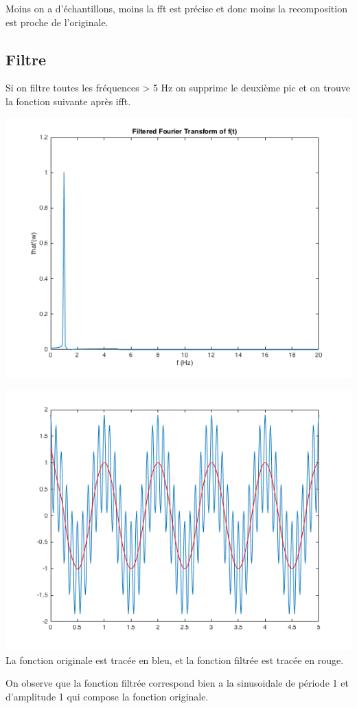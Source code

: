 \documentclass[a4paper,11pt]{article}
\begin{document}
Moins on a d'échantillons, moins la fft est précise et donc moins la recomposition est proche de l'originale.

\subsection{Filtre}
Si on filtre toutes les fréquences > 5 Hz on supprime le deuxième pic et on trouve la fonction suivante après ifft.
\begin{center}
\includegraphics[scale=0.6]{"fhatlow.png"} \newline
\end{center}
\begin{center}
\includegraphics[scale=0.6]{"f_and_Fhatlow.png"} \newline
La fonction originale est tracée en bleu, et la fonction filtrée est tracée en rouge.
\end{center}
On observe que la fonction filtrée correspond bien a la sinusoidale de période 1 et d'amplitude 1 qui compose la fonction originale. \newline
\end{document}
